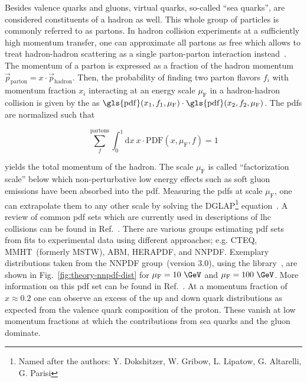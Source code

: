 Besides valence quarks and gluons, virtual quarks, so-called ``sea quarks'', are considered constituents of a hadron as well. This whole group of particles is commonly referred to as partons. In hadron collision experiments at a sufficiently high momentum transfer, one can approximate all partons as free which allows to treat hadron-hadron scattering as a single parton-parton interaction instead~\cite{Feynman:1969wa}. The momentum of a parton is expressed as a fraction of the hadron momentum $\vec{p}_\mathrm{parton}=x\cdot \vec{p}_\mathrm{hadron}$. Then, the probability of 
finding two parton flavors $f_{i}$ with momentum fraction $x_{i}$ interacting at an energy scale $\mu_\mathrm{F}$ in a hadron-hadron collision is given by the  as $\mathrm{\gls{pdf}}(x_{1},f_{1},\mu_\mathrm{F})\cdot\mathrm{\gls{pdf}}(x_{2},f_{2},\mu_\mathrm{F})$. The \glspl{pdf} are normalized such that

\begin{equation}
\sum_{f}^\mathrm{partons}\int_{0}^{1}\mathrm{d}x~x\cdot \mathrm{PDF}(x,\mu_\mathrm{F},f)=1
\end{equation}

yields the total momentum of the hadron. The scale $\mu_\mathrm{F}$ is called ``factorization scale'' below which non-perturbative low energy effects such as soft gluon emissions have been absorbed into the \gls{pdf}. Measuring the \glspl{pdf} at scale $\mu_\mathrm{F}$, one can extrapolate them to any other scale by solving the DGLAP\footnote{Named after the authors: Y. Dokshitzer, W. Gribow, L. Lipatow, G. Altarelli, G. Parisi} equation~\cite{Dokshitzer:1977sg,Gribov:1972ri,Altarelli:1977zs}. A review of common \gls{pdf} sets which are currently used in descriptions of \gls{lhc} collisions can be found in Ref.~\cite{Accardi2016}. There are various groups estimating \gls{pdf} sets from fits to experimental data using different approaches; e.g. CTEQ, MMHT~(formerly MSTW), ABM, HERAPDF, and NNPDF. Exemplary distributions taken from the NNPDF group~(version 3.0), using the \LHAPDF[format=hyperbf] library~\cite{Buckley:2014ana}, are shown in Fig.~\ref{fig:theory-nnpdf-dist} for $\mu_\mathrm{F}=10~\GeV$ and $\mu_\mathrm{F}=100~\GeV$. More information on this \gls{pdf} set can be found in Ref.~\cite{Ball:2014uwa}. At a momentum fraction of $x\approx0.2$ one can observe an excess of the up and down quark distributions as expected from the valence quark composition of the proton. These vanish at low momentum fractions at which the contributions from sea quarks and the gluon dominate.

